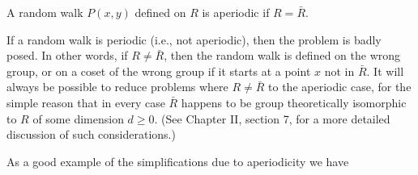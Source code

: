 A random walk $P(x,y)$ defined on $R$ is aperiodic if $R = \bar{R}$.

If a random walk is periodic (i.e., not aperiodic), then the problem is badly posed. In other words, if $R \neq \bar{R}$, then the random walk is defined on the wrong group, or on a coset of the wrong group if it starts at a point $x$ not in $\bar{R}$. It will always be possible to reduce problems where $R \neq \bar{R}$ to the aperiodic case, for the simple reason that in every case $\bar{R}$ happens to be group theoretically isomorphic to $R$ of some dimension $d \geq 0$. (See Chapter II, section 7, for a more detailed discussion of such considerations.)

As a good example of the simplifications due to aperiodicity we have